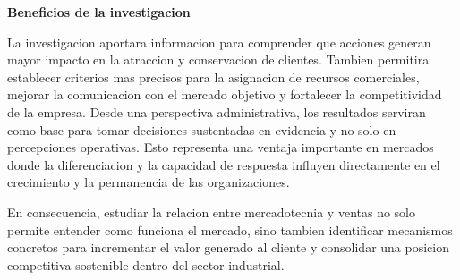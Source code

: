 \documentclass[
	spanish,
	letterpaper, oneside
]{article}
\begin{document}
\textbf{Beneficios de la investigacion}

La investigacion aportara informacion para comprender que acciones generan mayor impacto en la atraccion y conservacion de clientes. Tambien permitira establecer criterios mas precisos para la asignacion de recursos comerciales, mejorar la comunicacion con el mercado objetivo y fortalecer la competitividad de la empresa. Desde una perspectiva administrativa, los resultados serviran como base para tomar decisiones sustentadas en evidencia y no solo en percepciones operativas. Esto representa una ventaja importante en mercados donde la diferenciacion y la capacidad de respuesta influyen directamente en el crecimiento y la permanencia de las organizaciones.

En consecuencia, estudiar la relacion entre mercadotecnia y ventas no solo permite entender como funciona el mercado, sino tambien identificar mecanismos concretos para incrementar el valor generado al cliente y consolidar una posicion competitiva sostenible dentro del sector industrial.

\clearpage
\nocite{itescaSitioWeb,itescaMGAOferta,snhuAdminMerca2023,uaehFundMercadotecnia}

\end{document}
